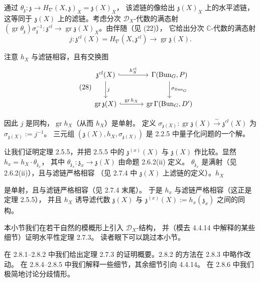 通过 $\theta_{\mathfrak{z}}:\mathfrak{z}\to H_\nabla(X,\mathfrak{z})_X=\mathfrak{z}(X)_X$，
该滤链的像给出 $\mathfrak{z}(X)_X$ 上的水平滤链，
这等同于 $\mathfrak{z}(X)$ 上的滤链。考虑分次 $\mathcal{D}_X$-代数的满态射
$(\operatorname{gr}\theta_{\mathfrak{z}})\sigma_{\mathfrak{z}}^{-1}:\mathfrak{z}^{cl}\to
\operatorname{gr}\mathfrak{z}(X)_X$。由伴随（见 (22)），
它给出分次 $\mathbb{C}$-代数的满态射
\[
  j:\mathfrak{z}^{cl}(X)=H_\nabla(X,\mathfrak{z}^{cl})\longrightarrow\operatorname{gr}\mathfrak{z}(X).
\]

注意 $h_X$ 与滤链相容，且有交换图
\begin{equation}\tag{28}
\begin{tikzcd}[column sep=3.4em, row sep=2.4em]
\mathfrak{z}^{cl}(X) \arrow[r, hook, "h^{cl}_X"] \arrow[d, "j"]
  & \Gamma(\operatorname{Bun}_G,P) \arrow[d, "\sigma_{\operatorname{Bun}_G}"] \\
\operatorname{gr}\mathfrak{z}(X) \arrow[r, hook, "\operatorname{gr}h_X"]
  & \operatorname{gr}\Gamma(\operatorname{Bun}_G,D')
\end{tikzcd}
\end{equation}

因此 $j$ 是同构，$\operatorname{gr}h_X$（从而 $h_X$）是单射。
定义 $\sigma_{\mathfrak{z}(X)}:\operatorname{gr}\mathfrak{z}(X)\xrightarrow{\sim}
\mathfrak{z}^{cl}(X)$ 为 $\sigma_{\mathfrak{z}(X)}:=j^{-1}$。
三元组 $(\mathfrak{z}(X),h_X,\sigma_{\mathfrak{z}(X)})$ 是 2.2.5 中量子化问题的一个解。

 让我们证明定理 2.5.5，并把 2.5.5 中的 $\mathfrak{z}^{(x)}(X)$
与 $\mathfrak{z}(X)$ 作比较。显然 $h_x=h_X\cdot\theta_{\mathfrak{z}_x}$，
其中 $\theta_{\mathfrak{z}_x}:\mathfrak{z}_x\to\mathfrak{z}(X)$ 由命题 2.6.2(ii) 定义。
$\theta_{\mathfrak{z}_x}$ 是满射（见 2.6.2(ii)），且与滤链严格相容
（见 2.7.4 中 $\mathfrak{z}(X)$ 上滤链的定义）。$h_X$


是单射，且与滤链严格相容（见 2.7.4 末尾）。
于是 $h_x$ 与滤链严格相容（这正是定理 2.5.5），
并且 $h_X$ 诱导滤代数 $\mathfrak{z}(X)$ 与
$\mathfrak{z}^{(x)}(X):=h_x(\mathfrak{z}_x)$ 之间的同构。

 本小节我们在若干自然的模概形上引入 $\mathcal{D}_X$-结构，
并（模去 4.4.14 中解释的某些细节）证明水平性定理 2.7.3。
读者眼下可以跳过本小节。

在 2.8.1--2.8.2 中我们给出定理 2.7.3 的证明概要。2.8.2 的方法在 2.8.3 中略作改动。
在 2.8.4--2.8.5 中我们解释一些细节，其余细节引向 4.4.14。
在 2.8.6 中我们极简地讨论分歧情形。

